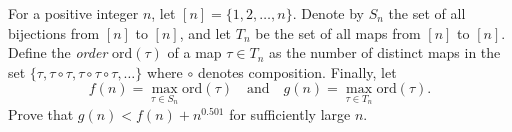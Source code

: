 For a positive integer \(n\), let \([n] = \{1, 2, \ldots, n\}\). Denote by \(S_n\) the set of all bijections from \([n]\) to \([n]\), and let \(T_n\) be the set of all maps from \([n]\) to \([n]\). Define the \textit{order} \(\mathrm{ord}(\tau)\) of a map \(\tau \in T_n\) as the number of distinct maps in the set \(\{\tau, \tau \circ \tau, \tau \circ \tau \circ \tau, \ldots\}\) where \(\circ\) denotes composition. Finally, let
\[
f(n) = \max_{\tau \in S_n} \mathrm{ord}(\tau) \quad \text{and} \quad g(n) = \max_{\tau \in T_n} \mathrm{ord}(\tau).
\]
Prove that \(g(n) < f(n) + n^{0.501}\) for sufficiently large \(n\).
